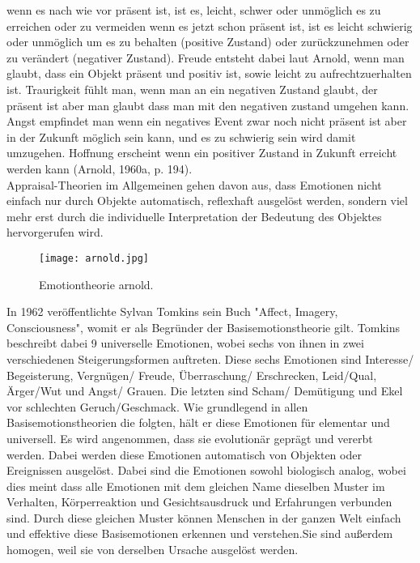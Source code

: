  wenn es nach wie vor präsent ist, ist es, leicht, schwer oder unmöglich es zu erreichen oder zu vermeiden
 wenn es jetzt schon präsent ist, ist es leicht schwierig oder unmöglich  um es zu behalten (positive Zustand) oder zurückzunehmen oder zu verändert (negativer Zustand). Freude entsteht dabei laut Arnold, wenn man glaubt, dass ein Objekt präsent und positiv ist, sowie leicht zu aufrechtzuerhalten ist. Traurigkeit fühlt man, wenn man an ein negativen Zustand glaubt, der präsent ist aber man glaubt dass man mit den negativen zustand umgehen kann. Angst empfindet man wenn ein negatives Event zwar noch nicht präsent ist aber in der Zukunft möglich sein kann, und es zu schwierig sein wird damit umzugehen. Hoffnung erscheint wenn ein positiver Zustand in Zukunft erreicht werden kann (Arnold,  1960a,  p.  194).\\
Appraisal-Theorien im Allgemeinen gehen davon aus, dass Emotionen nicht einfach nur durch Objekte automatisch, reflexhaft ausgelöst werden, sondern viel mehr erst durch die individuelle Interpretation der Bedeutung des Objektes hervorgerufen wird.

\begin{figure}
 \centering
 \texttt{[image: arnold.jpg]}
 \caption{\label{fig:procedure} Emotiontheorie arnold.}
\end{figure}

In 1962 veröffentlichte Sylvan Tomkins sein Buch "Affect, Imagery, Consciousness", womit er als Begründer der Basisemotionstheorie gilt. Tomkins beschreibt dabei 9 universelle Emotionen, wobei sechs von ihnen in zwei verschiedenen Steigerungsformen auftreten. Diese sechs Emotionen sind Interesse/ Begeisterung, Vergnügen/ Freude, Überraschung/ Erschrecken, Leid/Qual, Ärger/Wut und Angst/ Grauen. Die letzten sind Scham/ Demütigung und Ekel vor schlechten Geruch/Geschmack. Wie grundlegend in allen Basisemotionstheorien die folgten, hält er diese Emotionen für elementar und universell. Es wird angenommen, dass sie evolutionär geprägt und vererbt werden. Dabei werden diese Emotionen automatisch von Objekten oder 
Ereignissen ausgelöst. Dabei sind die Emotionen sowohl biologisch analog, wobei dies meint dass  alle Emotionen mit dem gleichen Name dieselben Muster im Verhalten, Körperreaktion und Gesichtsausdruck und Erfahrungen verbunden sind. Durch diese gleichen Muster können Menschen in der ganzen Welt einfach und effektive diese Basisemotionen erkennen und verstehen.Sie sind außerdem homogen, weil sie von derselben Ursache ausgelöst werden.\\

